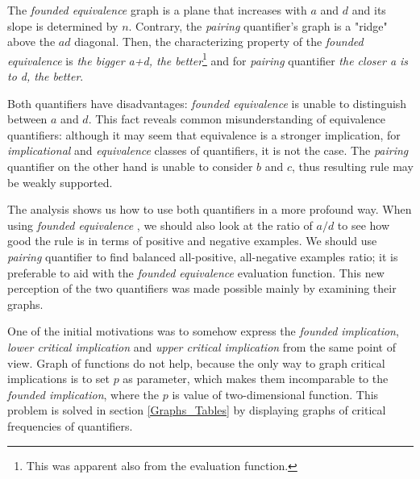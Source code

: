 The {\it founded equivalence \/} graph is a plane that increases with $a$ and $d$ and its slope is determined by $n$. Contrary, the {\it pairing \/} quantifier's graph is a "ridge" above the $a d$ diagonal. Then, the characterizing property of the {\it founded equivalence \/} is \emph{the bigger a+d, the better}\footnote{This was apparent also from the evaluation function.} and for {\it pairing \/} quantifier \emph{the closer a is to d, the better}.

Both quantifiers have disadvantages: {\it founded equivalence \/} is unable to distinguish between $a$ and $d$. This fact reveals common misunderstanding of equivalence quantifiers:
although it may seem that equivalence is a stronger implication, for {\it implicational \/}
and {\it equivalence \/} classes of quantifiers, it is not the case.
The {\it pairing \/} quantifier on the other hand is unable to consider $b$ and $c$, thus resulting rule may be weakly supported. 

The analysis shows us how to use both quantifiers in a more profound way. When using {\it founded equivalence \/}, we should also look at the ratio of $a/d$ to see how good the rule is in terms of positive and negative examples. We should use {\it pairing \/} quantifier to find balanced all-positive, all-negative examples ratio; it is preferable to aid
with the {\it founded equivalence \/} evaluation function. This new perception of the two quantifiers was made possible mainly by examining their graphs.

\medskip

One of the initial motivations was to somehow express the \emph{founded implication}, \emph{lower critical implication }and \emph{upper critical implication} from the same point of view. Graph of functions do not help, because the only way to graph critical implications is to set $p$ as parameter, which makes them incomparable to the \emph{founded implication}, where the $p$ is value of two-dimensional function. This problem is solved in section \ref{Graphs_Tables} by displaying graphs of critical frequencies of quantifiers. 